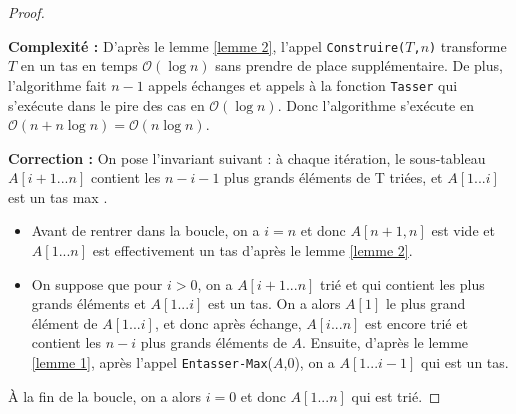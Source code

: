 \begin{proof}~

\textbf{Complexité :} D'après le lemme \ref{lemme 2}, l'appel \texttt{Construire($T$,$n$)} transforme $T$ en un tas en temps $\mathcal{O}(\log n)$ sans prendre de place supplémentaire. De plus, l'algorithme fait $n-1$ appels échanges et appels à la fonction \texttt{Tasser} qui s'exécute dans le pire des cas en $\mathcal{O}(\log n)$. Donc l'algorithme s'exécute en $\mathcal{O}(n+n \log n) = \mathcal{O}(n\log n)$.


\textbf{Correction :} On pose l'invariant suivant : \og à chaque itération, le sous-tableau $A[i+1...n]$ contient les $n-i-1$ plus grands éléments de T triées, et $A[1...i]$ est un tas max \fg{}.
\begin{itemize}
\item Avant de rentrer dans la boucle, on a $i=n$ et donc $A[n+1,n]$ est vide et $A[1...n]$ est effectivement un tas d'après le lemme \ref{lemme 2}. 
\item On suppose que pour $i>0$, on a $A[i+1...n]$ trié et qui contient les plus grands éléments et $A[1...i]$ est un tas. On a alors $A[1]$ le plus grand élément de $A[1...i]$, et donc après échange, $A[i...n]$ est encore trié et contient les $n-i$ plus grands éléments de $A$. Ensuite, d'après le lemme \ref{lemme 1}, après l'appel \texttt{Entasser-Max}($A$,$0$), on a $A[1...i-1]$ qui est un tas.
\end{itemize} 

À la fin de la boucle, on a alors $i=0$ et donc $A[1...n]$ qui est trié.
\end{proof}

